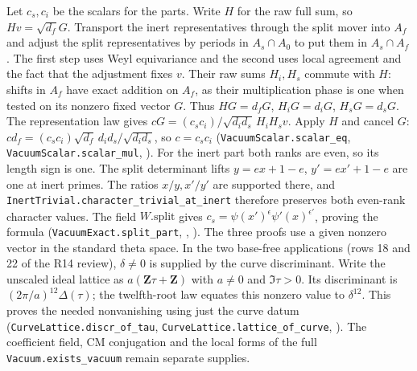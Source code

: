 Let $c_s,c_i$ be the scalars for the parts. Write $H$ for the raw
full sum, so $Hv=\sqrt{d_f}G$. Transport the inert representatives
through the split mover into $A_f$ and adjust the split representatives
by periods in $A_s\cap A_0$ to put them in $A_s\cap A_f$. The first
step uses Weyl equivariance and the second uses local agreement and the
fact that the adjustment fixes $v$. Their raw sums $H_i,H_s$ commute
with $H$: shifts in $A_f$ have exact addition on $A_f$, as their
multiplication phase is one when tested on its nonzero fixed vector
$G$. Thus $HG=d_fG$, $H_iG=d_iG$, $H_sG=d_sG$. The representation
law gives
$cG=(c_sc_i)/\sqrt{d_id_s}\,H_iH_s v$. Apply $H$ and cancel $G$:
$c d_f=(c_sc_i)\sqrt{d_f}\,d_id_s/\sqrt{d_id_s}$, so $c=c_s c_i$
(\nolinkurl{VacuumScalar.scalar_eq}, \nolinkurl{VacuumScalar.scalar_mul},
).
For the inert part both ranks are even, so its length sign is one.
The split determinant lifts $y=ex+1-e$, $y'=ex'+1-e$ are one at
inert primes. The ratios $x/y,x'/y'$ are supported there, and
\nolinkurl{InertTrivial.character_trivial_at_inert} therefore preserves
both even-rank character values. The field $W.\mathrm{split}$ gives
$c_s=\psi(x')^{\epsilon}\psi'(x)^{\epsilon'}$, proving the formula
(\nolinkurl{VacuumExact.split_part},
,
).
The three proofs use a given nonzero vector in the standard theta
space. In the two base-free applications (rows 18 and 22 of the
R14 review), $\delta\ne0$ is supplied by the curve
discriminant. Write the unscaled ideal lattice as $a(\mathbf Z\tau+
\mathbf Z)$ with $a\ne0$ and $\Im\tau>0$. Its discriminant is
$(2\pi/a)^{12}\Delta(\tau)$; the twelfth-root law equates this
nonzero value to $\delta^{12}$. This proves the needed nonvanishing
using just the curve datum
(\nolinkurl{CurveLattice.discr_of_tau}, \nolinkurl{CurveLattice.lattice_of_curve},
).
The coefficient field, CM conjugation and the local forms of
the full \nolinkurl{Vacuum.exists_vacuum} remain separate supplies.

